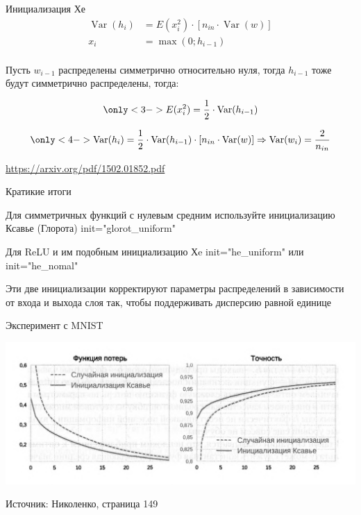 \documentclass[notes,12pt, aspectratio=169]{beamer}
\newenvironment{wideitemize}{\itemize\addtolength{\itemsep}{10pt}}{\enditemize}
\DeclareMathOperator{\Var}{Var}
\begin{document}
\begin{frame}{Инициализация Хе}
\begin{align*} 	
\Var(h_i)  & =   E(x_i^2)  \cdot [n_{in} \cdot \Var(w)] \\
x_i & = \max(0; h_{i-1}) \\ 
\end{align*} \pause 

 { Пусть $w_{i-1}$ распределены симметрично относительно нуля, тогда $h_{i-1}$ тоже будут симметрично распределены, тогда: }

$$
\only<3->{ E(x_i^2) = \frac{1}{2} \cdot \Var(h_{i-1}) }
$$

$$
\only<4->{ \Var(h_i) =  \frac{1}{2} \cdot \Var(h_{i-1}) \cdot [n_{in} \cdot \Var(w)]  \Rightarrow \Var(w_i) = \frac{2}{n_{in}} }
$$

\vfill %
\footnotesize
{\color{blue} \url{https://arxiv.org/pdf/1502.01852.pdf}}
\end{frame}


\begin{frame}{Кратикие итоги}
\begin{wideitemize}
\item  Для симметричных функций с нулевым средним используйте инициализацию Ксавье (Глорота) {\color{green}  init="glorot\_uniform"} 
\item  Для ReLU и им подобным инициализацию Хe {\color{green} init="he\_uniform"} или {\color{green} init="he\_nomal"}
\item  Эти две инициализации корректируют параметры распределений в зависимости от входа и выхода слоя так, чтобы поддерживать дисперсию равной единице
\end{wideitemize}
\end{frame}


\begin{frame}{Эксперимент с MNIST}
\begin{center}
\includegraphics[width=.8\linewidth]{nicol_init.png}
\end{center}

\vfill
{\small  Источник: Николенко, страница 149}
\end{frame}
\end{document}
